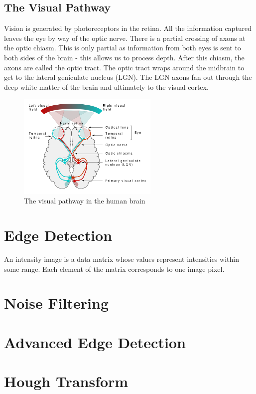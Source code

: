 \documentclass{article}
\begin{document}
	\subsection{The Visual Pathway}
	Vision is generated by photoreceptors in the retina. All the information captured leaves the eye by way of the optic nerve. There is a partial crossing of axons at the optic chiasm. This is only partial as information from both eyes is sent to both sides of the brain - this allows us to process depth. After this chiasm, the axons are called the optic tract. The optic tract wraps around the midbrain to get to the lateral geniculate nucleus (LGN). The LGN axons fan out through the deep white matter of the brain and ultimately to the visual cortex.
	\begin{figure}[h]
		\centering
		\includegraphics[width=0.6\textwidth]{visual_pathway}
		\caption{The visual pathway in the human brain}
		\label{fig:visual pathway}
	\end{figure}
	
	\section{Edge Detection}
	An intensity image is a data matrix whose values represent intensities within some range. Each element of the matrix corresponds to one image pixel.

	\section{Noise Filtering}

	\section{Advanced Edge Detection}

	\section{Hough Transform}
\end{document}
